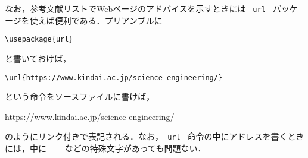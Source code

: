なお，参考文献リストでWebページのアドバイスを示すときには \verb+ url + パッケージを使えば便利である．プリアンブルに
\begin{screen}
\begin{verbatim}
\usepackage{url}
\end{verbatim}
\end{screen}
と書いておけば，
\begin{screen}
\begin{verbatim}
\url{https://www.kindai.ac.jp/science-engineering/}
\end{verbatim}
\end{screen}
という命令をソースファイルに書けば，
\begin{screen}
\url{https://www.kindai.ac.jp/science-engineering/}
\end{screen}
のようにリンク付きで表記される．なお，\verb+ url + 命令の中にアドレスを書くときには，中に \verb+ _ + などの特殊文字があっても問題ない．

   